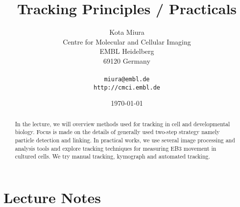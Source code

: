 \documentclass[11pnt]{article}
\begin{document}
\author{Kota Miura\\
  Centre for Molecular and Cellular Imaging\\
  EMBL Heidelberg\\
  69120  Germany\\
  \\
  \texttt{miura@embl.de}\\
  \texttt{http://cmci.embl.de}}
\date{\today}
\title{Tracking Principles / Practicals}
\maketitle

\begin{abstract}
In the lecture, we will overview methods used for tracking in cell and developmental biology. Focus is made on the details of generally used two-step strategy namely particle detection and linking. In practical works, we use several image processing and analysis tools and explore tracking techniques for measuring EB3 movement in cultured cells. We try manual tracking, kymograph and automated tracking. 
\end{abstract}

\section{Lecture Notes}
\end{document}

